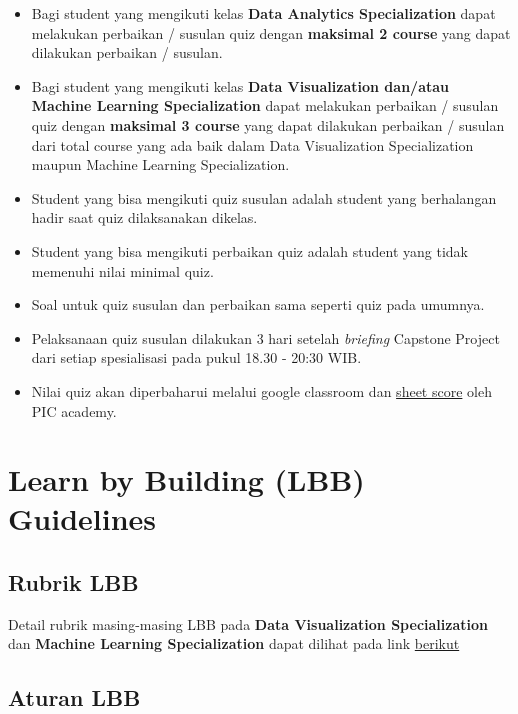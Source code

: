 \documentclass[
]{book}
\providecommand{\tightlist}{%
  \setlength{\itemsep}{0pt}\setlength{\parskip}{0pt}}
\begin{document}
\begin{itemize}
\tightlist
\item
  Bagi student yang mengikuti kelas \textbf{Data Analytics Specialization} dapat melakukan perbaikan / susulan quiz dengan \textbf{maksimal 2 course} yang dapat dilakukan perbaikan / susulan.
\item
  Bagi student yang mengikuti kelas \textbf{Data Visualization dan/atau Machine Learning Specialization} dapat melakukan perbaikan / susulan quiz dengan \textbf{maksimal 3 course} yang dapat dilakukan perbaikan / susulan dari total course yang ada baik dalam Data Visualization Specialization maupun Machine Learning Specialization.
\item
  Student yang bisa mengikuti quiz susulan adalah student yang berhalangan hadir saat quiz dilaksanakan dikelas.
\item
  Student yang bisa mengikuti perbaikan quiz adalah student yang tidak memenuhi nilai minimal quiz.
\item
  Soal untuk quiz susulan dan perbaikan sama seperti quiz pada umumnya.
\item
  Pelaksanaan quiz susulan dilakukan 3 hari setelah \emph{briefing} Capstone Project dari setiap spesialisasi pada pukul 18.30 - 20:30 WIB.
\item
  Nilai quiz akan diperbaharui melalui google classroom dan \href{https://docs.google.com/spreadsheets/d/1cGJ0pn9k9gKCBnceWVwaL9D7BBDMNjLh8uPYlaBlJi8/edit?usp=sharing}{sheet score} oleh PIC academy.
\end{itemize}

\hypertarget{learn-by-building-lbb-guidelines}{%
\section{Learn by Building (LBB) Guidelines}\label{learn-by-building-lbb-guidelines}}

\hypertarget{rubrik-lbb}{%
\subsection{Rubrik LBB}\label{rubrik-lbb}}

Detail rubrik masing-masing LBB pada \textbf{Data Visualization Specialization} dan \textbf{Machine Learning Specialization} dapat dilihat pada link \href{https://rpubs.com/AlgoritmaAcademy/lbb}{berikut}

\hypertarget{aturan-lbb}{%
\subsection{Aturan LBB}\label{aturan-lbb}}
\end{document}
